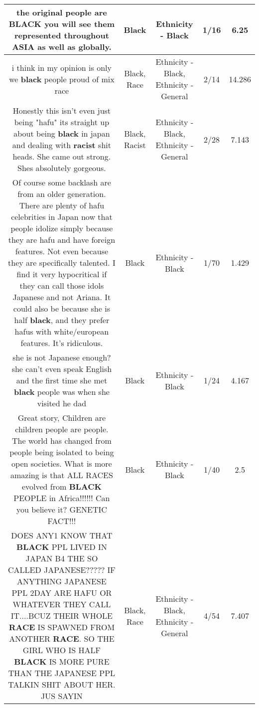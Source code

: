 \documentclass[11pt]{article}
\newlength\mylength
\begin{document}
\begin{center}
\begin{longtable}{|C{.65\mylength}|C{.30\mylength}|C{.12\mylength}|C{.12\mylength}|C{.12\mylength}|}
  \small the original people are \textbf{BLACK} you will see them represented throughout ASIA as well as globally.\normalsize   & Black & Ethnicity - Black & 1/16 & 6.25 \\  \hline
  \small i think in my opinion is only we \textbf{black} people proud of mix race\normalsize   & Black, Race & Ethnicity - Black, Ethnicity - General & 2/14 & 14.286 \\  \hline
  \small Honestly this isn't even just being "hafu" its straight up about being \textbf{black} in japan and dealing with \textbf{racist} shit heads. She came out strong. Shes absolutely gorgeous.\normalsize   & Black, Racist & Ethnicity - Black, Ethnicity - General & 2/28 & 7.143 \\  \hline
  \small Of course some backlash are from an older generation. There are plenty of hafu celebrities in Japan now that people idolize simply because they are hafu and have foreign features. Not even because they are specifically talented. I find it very hypocritical if they can call those idols Japanese and not Ariana. It could also be because she is half \textbf{black}, and they prefer hafus with white/european features. It's ridiculous.\normalsize   & Black & Ethnicity - Black & 1/70 & 1.429 \\  \hline
  \small she is not Japanese enough?she can't even speak English and the first time she met \textbf{black} people was when she visited he dad\normalsize   & Black & Ethnicity - Black & 1/24 & 4.167 \\  \hline
  \small Great story, Children are children people are people. The world has changed from people being isolated to being open societies. What is more amazing is that ALL RACES evolved from \textbf{BLACK} PEOPLE in Africa!!!!!! Can you believe it? GENETIC FACT!!!\normalsize   & Black & Ethnicity - Black & 1/40 & 2.5 \\  \hline
  \small DOES ANY1 KNOW THAT \textbf{BLACK} PPL LIVED IN JAPAN B4 THE SO CALLED JAPANESE????? IF ANYTHING JAPANESE PPL 2DAY ARE HAFU OR WHATEVER THEY CALL IT....BCUZ THEIR WHOLE \textbf{RACE} IS SPAWNED FROM ANOTHER \textbf{RACE}. SO THE GIRL WHO IS HALF \textbf{BLACK} IS MORE PURE THAN THE JAPANESE PPL TALKIN SHIT ABOUT HER. JUS SAYIN\normalsize   & Black, Race & Ethnicity - Black, Ethnicity - General & 4/54 & 7.407 \\  \hline

\end{longtable}
\end{center}
\end{document}
